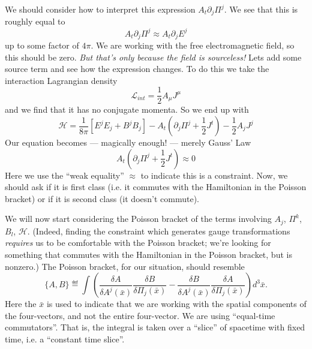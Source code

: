 We should consider how to interpret this
expression
$A_{t}\partial_{j}\Pi^{j}$. We see that this is roughly equal to
\begin{equation}%
A_{t}\partial_{j}\Pi^{j} \approx A_{t}\partial_{j}E^{j}
\end{equation}
up to some factor of $4\pi$. We are working with the free
electromagnetic field, so this should be zero. \emph{But that's
  only because the field is sourceless!} Lets add some source
term and see how the expression changes. To do this we take the
interaction Lagrangian density
\begin{equation}%
\mathcal{L}_{int} = \frac{1}{2}A_{\mu}J^{\mu}
\end{equation}
and we find that it has no conjugate momenta. So we end up with
\begin{equation}%
\mathcal{H} = \frac{1}{8\pi}\left[E^{j}E_{j}+B^{j}B_{j}\right] - A_{t}(\partial_{j}\Pi^{j}+\frac{1}{2}J^{t})-\frac{1}{2}A_{j}J^{j}
\end{equation}
Our equation becomes --- magically enough! --- merely Gauss' Law
\begin{equation}%
A_{t}(\partial_{j}\Pi^{j}+\frac{1}{2}J^{t})\approx 0
\end{equation}
Here we use the ``weak equality'' $\approx$ to indicate this is a
constraint. Now, we should ask if it is first class (i.e. it
commutes with the Hamiltonian in the Poisson bracket) or if it is
second class (it doesn't commute).

 We will now start
considering the Poisson bracket of the terms involving $A_{j}$,
$\Pi^{k}$, $B_{l}$, $\mathcal{H}$. (Indeed, finding the
constraint which generates gauge transformations \emph{requires}
us to be comfortable with the Poisson bracket; we're looking for
something that commutes with the Hamiltonian in the Poisson
bracket, but is nonzero.) The Poisson bracket, for our situation,
should resemble
\begin{equation}%
\{A,B\}\eqdef\int\left(\frac{\delta A}{\delta
  A^{j}(\bar{x})}\frac{\delta
  B}{\delta\Pi_{j}(\bar{x})}-\frac{\delta B}{\delta A^{j}(\bar{x})}\frac{\delta A}{\delta\Pi_{j}(\bar{x})}\right)d^{3}\bar{x}.
\end{equation}
Here the $\bar{x}$ is used to indicate that we are working with
the spatial components of the four-vectors, and not the entire
four-vector. We are using ``equal-time commutators''. That is,
the integral is taken over a ``slice'' of spacetime with fixed
time, i.e. a ``constant time slice''.

